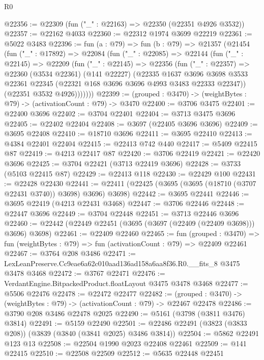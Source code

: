 \begin{lexlean}{R0}
\begin{coremodule}
@22356 := @22309 (fun ("_" : @22163) => @22350 (@22351 @4926 @3532))
@22357 := @22162 @4033
@22360 := @22312 @1974 @3699 @22219
@22361 := @5022 @3483
@22396 := fun (a : @79) =>
  fun (b : @79) =>
  @21357
    (@21454
      (fun ("_" : @17892) =>
      @22084
        (fun ("_" : @22085) =>
        @22144
          (fun ("_" : @22145) =>
          @22209
            (fun ("_" : @22145) =>
            @22356
              (fun ("_" : @22357) =>
              @22360
                (@3534 @22361)
                (@141 @22227)
                (@22335
                  @1637
                  @3696
                  @3698
                  @3533
                  @22361
                  @22345
                  (@22321 @168 @3696 @3696 @4993 @3483 @22333 @22347))
                (@22351 @3532 @4926)))))))
@22399 := (grouped : @3470) -> (weightBytes : @79) -> (activationCount : @79) -> @3470
@22400 := @3706 @3475
@22401 := @22400 @3696
@22402 := @3704 @22401
@22404 := @3713 @3475 @3696
@22405 := @22402 @22404
@22408 := @3697 (@22405 @3696 @3696)
@22409 := @3695 @22408
@22410 := @18710 @3696
@22411 := @3695 @22410
@22413 := @4384 @22401 @22404
@22415 := @22413 @742 @440
@22417 := @5409 @22415 @87
@22419 := @4213 @22417 @87
@22420 := @3706 @22419
@22421 := @22420 @3696
@22425 := @3704 @22421 (@3713 @22419 @3696)
@22428 := @3733 (@5103 @22415 @87)
@22429 := @22413 @118
@22430 := @22429 @100
@22431 := @22428 @22430
@22441 := @22411 (@22425 (@3695 (@3695 (@18710 (@3707 @22431 @3740)) @3698) @3696) @3698)
@22442 := @3695 @22441
@22446 := @3695 @22419 (@4213 @22431 @3468)
@22447 := @3706 @22446
@22448 := @22447 @3696
@22449 := @3704 @22448
@22451 := @3713 @22446 @3696
@22460 := @22442 (@22449 @22451 (@3695 (@3697 (@22409 (@22409 @3698))) @3696) @3698)
@22461 := @22409 @22460
@22465 := fun (grouped : @3470) =>
  fun (weightBytes : @79) => fun (activationCount : @79) => @22409 @22461
@22467 := @3764 @208 @3486
@22471 := LexLeanPreserve.Cc9eae6a62c010aad136ad158a6aa8f36.R0.__fits_8 @3475 @3478 @3468
@22472 := @3767 @22471
@22476 := VerdantEngine.BitpackedProduct.floatLayout @3475 @3478 @3468
@22477 := @5506 @22476
@22478 := @22472 @22477
@22482 := (grouped : @3470) -> (weightBytes : @79) -> (activationCount : @79) -> @22467 @22478
@22486 := @3790 @208 @3486 @22478 @2025
@22490 := @5161 (@3798 (@3811 @3476) @3814)
@22491 := @5159 @22490
@22501 := @22486 @22491 (@3823 (@3833 @208)) (@3839 (@3840 (@3841 @2025) @3486 @3814))
@22504 := @5862 @22491 @123 @13
@22508 := @22504 @1990 @2023 @22408 @22461
@22509 := @141 @22415
@22510 := @22508 @22509
@22512 := @5635 @22448 @22451

\end{coremodule}
\end{lexlean}
